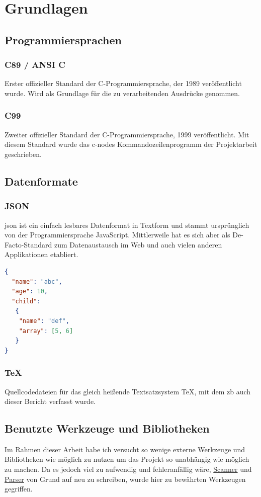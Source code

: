 \documentclass[oneside]{ausarbeitung}
\begin{document}
\chapter{Grundlagen}
\label{cha:grundlagen}

\section{Programmiersprachen}
\label{sec:prog_langs}

\subsection{C89 / ANSI C}
\label{sub:c89}
Erster offizieller Standard der C-Programmiersprache, der 1989 veröffentlicht wurde. Wird als Grundlage für die zu verarbeitenden Ausdrücke genommen.

\subsection{C99}
\label{sub:c99}
Zweiter offizieller Standard der C-Programmiersprache, 1999 veröffentlicht. Mit diesem Standard wurde das c-nodes Kommandozeilenprogramm der Projektarbeit geschrieben.

\section{Datenformate}
\label{sec:data}
\subsection{JSON}
\label{sub:json}
\ac{json} ist ein einfach lesbares Datenformat in Textform und stammt ursprünglich von der Programmiersprache JavaScript. Mittlerweile hat es sich aber als De-Facto-Standard zum Datenaustausch im Web und auch vielen anderen Applikationen etabliert.
\begin{lstlisting}[language=json, label={lst:json}, caption={Beispiel JSON}]
{ 
  "name": "abc",
  "age": 10,
  "child": 
   { 
    "name": "def",
    "array": [5, 6] 
   }
}
\end{lstlisting}
\subsection{TeX}
\label{sub:tex}
Quellcodedateien für das gleich heißende Textsatzsystem TeX, mit dem \ac{zb} auch dieser Bericht verfasst wurde.

\section{Benutzte Werkzeuge und Bibliotheken}
\label{sec:tools_libs}
Im Rahmen dieser Arbeit habe ich versucht so wenige externe Werkzeuge und Bibliotheken wie möglich zu nutzen um das Projekt so unabhängig wie möglich zu machen. Da es jedoch viel zu aufwendig und fehleranfällig wäre, \hyperref[sub:scanner]{Scanner} und \hyperref[sub:parser]{Parser} von Grund auf neu zu schreiben, wurde hier zu bewährten Werkzeugen gegriffen.
\end{document}

